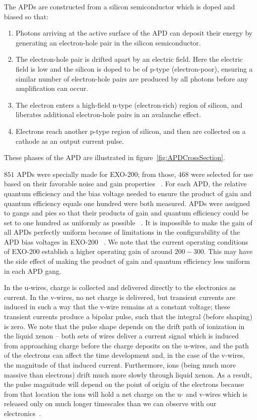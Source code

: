 The APDs are constructed from a silicon semiconductor which is doped and biased so that:~\cite{Moszynski2002504}
\begin{enumerate}
\item Photons arriving at the active surface of the APD can deposit their energy by generating an electron-hole pair in the silicon semiconductor.
\item The electron-hole pair is drifted apart by an electric field.  Here the electric field is low and the silicon is doped to be of p-type (electron-poor), ensuring a similar number of electron-hole pairs are produced by all photons before any amplification can occur.
\item The electron enters a high-field n-type (electron-rich) region of silicon, and liberates additional electron-hole pairs in an avalanche effect.
\item Electrons reach another p-type region of silicon, and then are collected on a cathode as an output current pulse.
\end{enumerate}
These phases of the APD are illustrated in figure~\ref{fig:APDCrossSection}.

$851$ APDs were specially made for EXO-200; from those, $468$ were selected for use based on their favorable noise and gain properties ~\cite{EXOLAAPD}.  For each APD, the relative quantum efficiency and the bias voltage needed to ensure the product of gain and quantum efficiency equals one hundred were both measured.  APDs were assigned to gangs and pies so that their products of gain and quantum efficiency could be set to one hundred as uniformly as possible ~\cite{APDMeasurementAndGanging}.  It is impossible to make the gain of all APDs perfectly uniform because of limitations in the configurability of the APD bias voltages in EXO-200 ~\cite{detectorPartI}.  We note that the current operating conditions of EXO-200 establish a higher operating gain of around $200-300$. This may have the side effect of making the product of gain and quantum efficiency less uniform in each APD gang.

In the u-wires, charge is collected and delivered directly to the electronics as current.  In the v-wires, no net charge is delivered, but transient currents are induced in such a way that the v-wire remains at a constant voltage; these transient currents produce a bipolar pulse, such that the integral (before shaping) is zero.  We note that the pulse shape depends on the drift path of ionization in the liquid xenon -- both sets of wires deliver a current signal which is induced from approaching charge before the charge deposits on the u-wires, and the path of the electrons can affect the time development and, in the case of the v-wires, the magnitude of that induced current.  Furthermore, ions (being much more massive than electrons) drift much more slowly through liquid xenon.  As a result, the pulse magnitude will depend on the point of origin of the electrons because from that location the ions will hold a net charge on the u- and v-wires which is released only on much longer timescales than we can observe with our electronics~\cite{EnergyDocumentRun2a,MCDocumentRun2a}.


